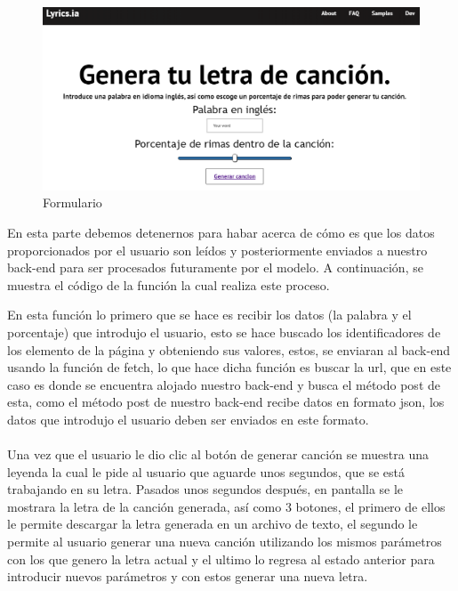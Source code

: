 \documentclass[12pt, a4paper, titlepage]{article}
\begin{document}
	\begin{figure}[H]
		\includegraphics[width=13.5cm]{./Imagenes/AplicacionWeb/Pformulario.png}
		\centering 
		\caption{Formulario}
	\end{figure}
	En esta parte debemos detenernos para habar acerca de cómo es que los datos proporcionados por el usuario son leídos y posteriormente enviados a nuestro back-end para ser procesados futuramente por el modelo. A continuación, se muestra el código de la función la cual realiza este proceso.
	\begin{center}
		
	\end{center}
	En esta función lo primero que se hace es recibir los datos (la palabra y el porcentaje) que introdujo el usuario, esto se hace buscado los identificadores de los elemento de la página y obteniendo sus valores, estos, se enviaran al back-end usando la función de fetch, lo que hace dicha función es buscar la url, que en este caso es donde se encuentra alojado nuestro back-end y busca el método post de esta, como el método post de nuestro back-end recibe datos en formato json, los datos que introdujo el usuario deben ser enviados en este formato.\\\\
	Una vez que el usuario le dio clic al botón de generar canción se muestra una leyenda la cual le pide al usuario que aguarde unos segundos, que se está trabajando en su letra. Pasados unos segundos después, en pantalla se le mostrara la letra de la canción generada, así como 3 botones, el primero de ellos le permite descargar la letra generada en un archivo de texto, el segundo le permite al usuario generar una nueva canción utilizando los mismos parámetros con los que genero la letra actual y el ultimo lo regresa al estado anterior para introducir nuevos parámetros y con estos generar una nueva letra.
\end{document}
